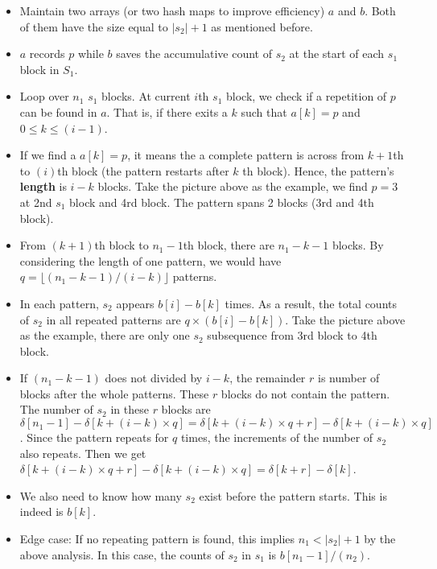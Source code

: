\begin{itemize}
\item Maintain two arrays (or two hash maps to improve efficiency) $a$ and $b$. Both of them have the size equal to $\lvert s_2\rvert+1$ as mentioned before.
\item $a$ records $p$ while $b$ saves the accumulative count of $s_2$ at the start of each $s_1$ block in $S_1$.
\item Loop over $n_1$ $s_1$ blocks. At current $i$th $s_1$ block, we check if a repetition of $p$ can be found in $a$. That is, if there exits a $k$ such that $a[k] = p$ and $0\leq k\leq (i-1)$.
\item If we find a $a[k]=p$, it means the a complete pattern is across from $k+1$th to $(i)$th block (the pattern restarts after $k$ th block). Hence, the pattern's \textbf{length} is $i-k$ blocks. Take the picture above as the example, we find $p=3$ at 2nd $s_1$ block and 4rd block. The pattern spans 2 blocks (3rd and 4th block).
\item From $(k+1)$th block to $n_1-1$th block, there are $n_1-k-1$ blocks. By considering the length of one pattern, we would have $q= \lfloor (n_1-k-1)/(i-k)\rfloor$ patterns.
\item In each pattern, $s_2$ appears $b[i] - b[k]$ times. As a result, the total counts of $s_2$ in all repeated patterns are $q\times (b[i]-b[k])$.  Take the picture above as the example, there are only one $s_2$ subsequence from 3rd block to 4th block.
\item If $(n_1-k-1)$ does not divided by $i-k$, the remainder $r$ is number of blocks after the whole patterns. These $r$ blocks do not contain the pattern. The number of $s_2$ in these $r$ blocks are $\delta[n_1-1] - \delta[k+(i-k)\times q] = \delta[k+(i-k)\times q + r] - \delta[k+(i-k)\times q]$. Since the pattern repeats for $q$ times, the increments of the number of $s_2$ also repeats. Then we get $\delta[k+(i-k)\times q + r] - \delta[k+(i-k)\times q] = \delta[k+r]-\delta[k]$. 
\item We also need to know how many $s_2$ exist before the pattern starts. This is indeed is $b[k]$.
\item Edge case: If no repeating pattern is found, this implies $n_1 < \lvert s_2\rvert+1$ by the above analysis. In this case, the counts of $s_2$ in $s_1$ is $b[n_1-1]/(n_2)$.
\end{itemize}

